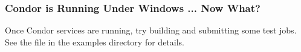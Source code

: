 
\subsubsection{\label{nt-running-now-what}
Condor is Running Under Windows ... Now What?}

Once Condor services are running, try building
and submitting some test jobs.  See the  file in the
examples directory
for details.
